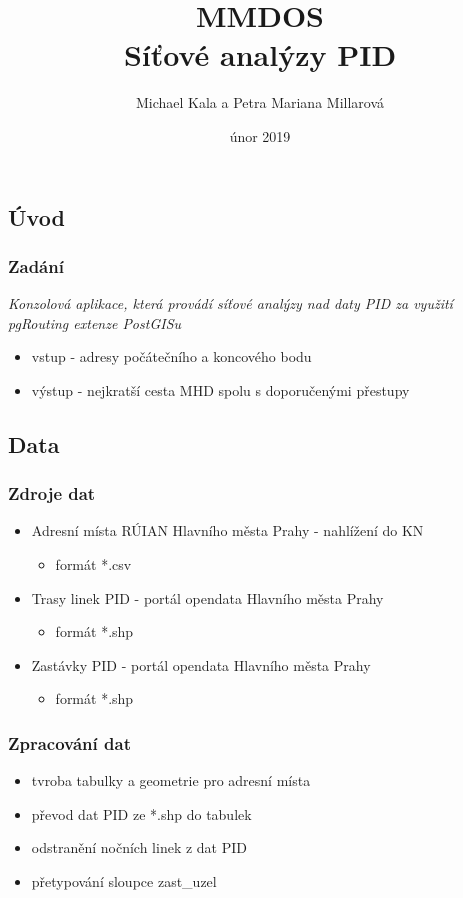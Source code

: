 \documentclass{beamer}
\title{MMDOS \\ Síťové analýzy PID}
\author{Michael Kala a Petra Mariana Millarová}
\date{únor 2019}
\begin{document}
\begin{frame}
\titlepage
\end{frame}

\begin{frame}
\section{Úvod}
\frametitle{Zadání}
\begin{block}{}
 \textit{Konzolová aplikace, která provádí síťové analýzy nad daty PID za využití pgRouting extenze PostGISu} 
 \end{block}
 
\begin{itemize}
	\item vstup - adresy počátečního a koncového bodu
	\item výstup - nejkratší cesta MHD spolu s doporučenými přestupy
\end{itemize}
\end{frame}

\begin{frame}
\section{Data}
\frametitle{Zdroje dat}
\begin{itemize}
	\item Adresní místa RÚIAN Hlavního města Prahy - nahlížení do KN
		\begin{itemize}
				\item formát *.csv
		\end{itemize}		 
	\item Trasy linek PID - portál opendata Hlavního města Prahy
		\begin{itemize}
			\item formát *.shp
		\end{itemize}
	\item Zastávky PID - portál opendata Hlavního města Prahy
		\begin{itemize}
			\item formát *.shp
		\end{itemize}
\end{itemize}
\end{frame}


\begin{frame}
\frametitle{Zpracování dat}
\begin{itemize}
	\item tvroba tabulky a geometrie pro adresní místa
	\item převod dat PID ze *.shp do tabulek
	\item odstranění nočních linek z dat PID
	\item přetypování sloupce zast\_uzel
\end{itemize}
\end{frame}
\end{document}

